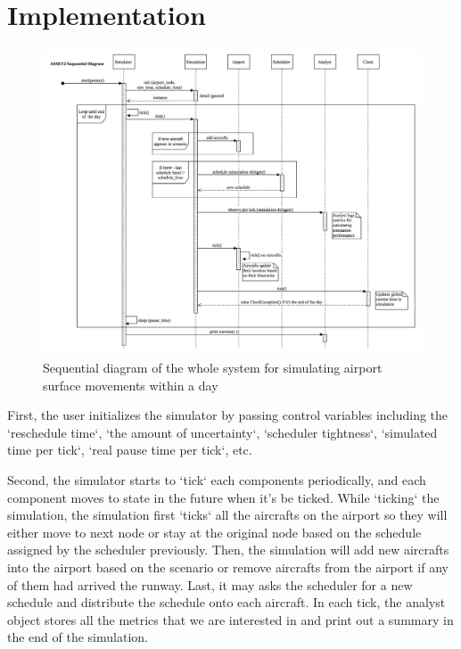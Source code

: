 \documentclass[conference]{IEEEtran}
\begin{document}
\section{Implementation}

\begin{figure}[!t]
\centering
\includegraphics[width=\textwidth,height=\textheight,keepaspectratio]{seq}
\caption{Sequential diagram of the whole system for simulating airport surface movements within a day\label{flow}}
\end{figure}

First, the user initializes the simulator by passing control variables including the `reschedule time`, `the amount of uncertainty`, `scheduler tightness`, `simulated time per tick`, `real pause time per tick`, etc.

Second, the simulator starts to `tick` each components periodically, and each component moves to state in the future when it's be ticked. While `ticking` the simulation, the simulation first `ticks` all the aircrafts on the airport so they will either move to next node or stay at the original node based on the schedule assigned by the scheduler previously. Then, the simulation will add new aircrafts into the airport based on the scenario or remove aircrafts from the airport if any of them had arrived the runway. Last, it may asks the scheduler for a new schedule and distribute the schedule onto each aircraft. In each tick, the analyst object stores all the metrics that we are interested in and print out a summary in the end of the simulation.
\end{document}
